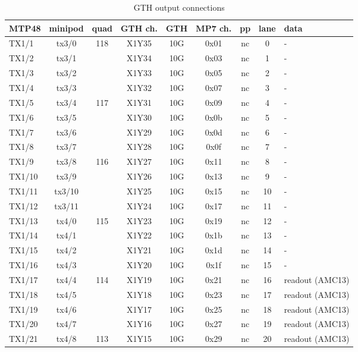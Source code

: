 \begin{longtable}{|l|c|c|c|c|c|c|c|l|}
\caption{GTH output connections}
    \label{tab:app:gth_o_conn}\\
\hline
\textbf{MTP48}& \textbf{minipod}& \textbf{quad}& \textbf{GTH ch.}& \textbf{GTH}& \textbf{MP7 ch.} &\textbf{pp}& \textbf{lane}& \textbf{data}\\
\hline
\hline
\endhead
TX1/1  & tx3/0  & 118 & X1Y35 & 10G & 0x01 & nc & 0  & -\\\hline
TX1/2  & tx3/1  &     & X1Y34 & 10G & 0x03 & nc & 1  & -\\\hline
TX1/3  & tx3/2  &     & X1Y33 & 10G & 0x05 & nc & 2  & -\\\hline
TX1/4  & tx3/3  &     & X1Y32 & 10G & 0x07 & nc & 3  & -\\\hline
TX1/5  & tx3/4  & 117 & X1Y31 & 10G & 0x09 & nc & 4  & -\\\hline
TX1/6  & tx3/5  &     & X1Y30 & 10G & 0x0b & nc & 5  & -\\\hline
TX1/7  & tx3/6  &     & X1Y29 & 10G & 0x0d & nc & 6  & -\\\hline
TX1/8  & tx3/7  &     & X1Y28 & 10G & 0x0f & nc & 7  & -\\\hline
TX1/9  & tx3/8  & 116 & X1Y27 & 10G & 0x11 & nc & 8  & -\\\hline
TX1/10 & tx3/9  &     & X1Y26 & 10G & 0x13 & nc & 9  & -\\\hline
TX1/11 & tx3/10 &     & X1Y25 & 10G & 0x15 & nc & 10 & -\\\hline
TX1/12 & tx3/11 &     & X1Y24 & 10G & 0x17 & nc & 11 & -\\\hline
TX1/13 & tx4/0  & 115 & X1Y23 & 10G & 0x19 & nc & 12 & -\\\hline
TX1/14 & tx4/1  &     & X1Y22 & 10G & 0x1b & nc & 13 & -\\\hline
TX1/15 & tx4/2  &     & X1Y21 & 10G & 0x1d & nc & 14 & -\\\hline
TX1/16 & tx4/3  &     & X1Y20 & 10G & 0x1f & nc & 15 & -\\\hline
TX1/17 & tx4/4  & 114 & X1Y19 & 10G & 0x21 & nc & 16 & readout (AMC13)\\\hline
TX1/18 & tx4/5  &     & X1Y18 & 10G & 0x23 & nc & 17 & readout (AMC13)\\\hline
TX1/19 & tx4/6  &     & X1Y17 & 10G & 0x25 & nc & 18 & readout (AMC13)\\\hline
TX1/20 & tx4/7  &     & X1Y16 & 10G & 0x27 & nc & 19 & readout (AMC13)\\\hline
TX1/21 & tx4/8  & 113 & X1Y15 & 10G & 0x29 & nc & 20 & readout (AMC13)\\\hline

\end{longtable}
